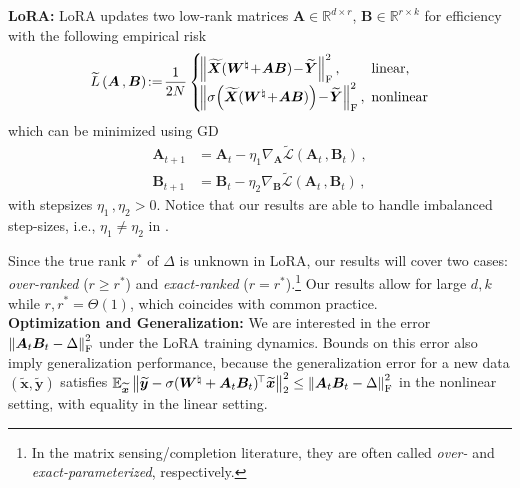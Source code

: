 \noindent
{\bf LoRA:} LoRA updates two low-rank matrices $\bm A \in \mathbb{R}^{d\times r}$, $\bm B \in \mathbb{R}^{r\times k}$ for efficiency with the following empirical risk
\begin{equation*}\label{eq:lab_linear}
    \begin{split}
        \widetilde{L}\left(\bm A\,,\bm B\right) \!:=\! \frac{1}{2N}
\begin{cases} 
\!\left\| \widetilde{\bm X}(\bm W^{\natural} \!+\! \bm A \bm B) \!-\!\widetilde{\bm Y}\right\|_{\rm F}^2, & \!\!\!\text{linear}, \\ 
\! \left\| \sigma\! \left( \widetilde{\bm X}(\bm W^{\natural} \!+\! \bm A \bm B) \right) \!-\! \widetilde{\bm Y}\right\|_{\rm F}^2, & \!\!\! \text{nonlinear}
\end{cases}
    \end{split}
\end{equation*}
which can be minimized using GD
\begin{equation}\label{eq:ABiter}
\begin{split}
     \bm A_{t+1} & = \bm A_t - \eta_1 \nabla_{\bm A} \widetilde{\mathcal{L}}\left(\bm A_t\,,\bm B_t\right)\,, \\
     \bm B_{t+1}  & = \bm B_t - \eta_2 \nabla_{\bm B} \widetilde{\mathcal{L}}\left(\bm A_t\,,\bm B_t\right)\,,
\end{split}
\end{equation}
with stepsizes $\eta_1\,,\eta_2>0$. Notice that our results are able to handle imbalanced step-sizes, i.e., $\eta_1 \neq \eta_2$ in \cite{hayou2024lora+}.

Since the true rank $r^*$ of $\Delta$ is unknown in LoRA, our results will cover two cases: {\em over-ranked} ($r \ge r^*$) and {\em exact-ranked} ($r=r^*$).\footnote{In the matrix sensing/completion literature, they are often called {\em over-} and {\em exact-parameterized}, respectively.}
Our results allow for large $d, k$ while $r, r^* = \Theta(1)$, which coincides with common practice.\\

\noindent
{\bf Optimization and Generalization:} We are interested in the error $\left\|\bm A_t \bm B_t - \Delta\right\|^2_{\rm F}$ under the LoRA training dynamics.
Bounds on this error also imply generalization performance, because the generalization error for a new data $(\widetilde{\bm x}, \widetilde{\bm y})$ satisfies $\mathbb{E}_{\widetilde{\bm x}} \left\| \widetilde{\bm y} - \sigma(\bm W^\natural+\bm A_t\bm B_t)^{\!\top} \widetilde{\bm x} \right\|_2^2 \leq \left\|\bm A_t \bm B_t - \Delta\right\|^2_{\rm F} $ in the nonlinear setting, with equality in the linear setting.




